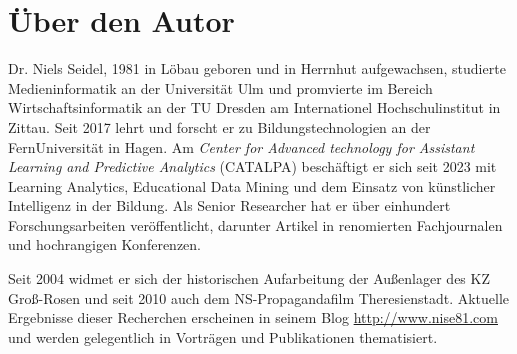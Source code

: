 

\section*{Über den Autor}
Dr. Niels Seidel, 1981 in Löbau geboren und in Herrnhut aufgewachsen, studierte Medieninformatik an der Universität Ulm und promvierte im Bereich Wirtschaftsinformatik an der TU Dresden am Internationel Hochschulinstitut in Zittau. Seit 2017 lehrt und forscht er zu Bildungstechnologien an der FernUniversität in Hagen. Am \textit{Center for Advanced technology for Assistant Learning and Predictive Analytics} (CATALPA) beschäftigt er sich seit 2023 mit Learning Analytics, Educational Data Mining und dem Einsatz von künstlicher Intelligenz in der Bildung. Als Senior Researcher hat er über einhundert Forschungsarbeiten veröffentlicht, darunter Artikel in renomierten Fachjournalen und hochrangigen Konferenzen.

Seit 2004 widmet er sich der historischen Aufarbeitung der Außenlager des KZ Groß-Rosen und seit 2010 auch dem NS-Propagandafilm Theresienstadt. Aktuelle Ergebnisse dieser Recherchen erscheinen in seinem Blog \url{http://www.nise81.com} und werden gelegentlich in Vorträgen und Publikationen thematisiert.
